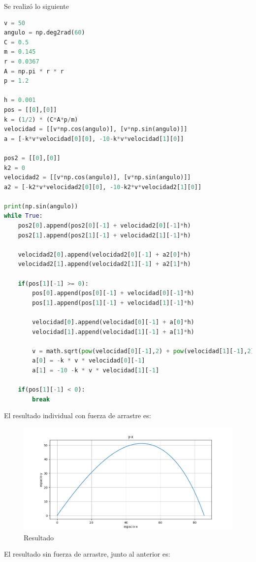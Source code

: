 \documentclass{article}
\begin{document}
Se realizó lo siguiente
\begin{lstlisting}[language=Python,caption=Desafío 1.1]
v = 50
angulo = np.deg2rad(60)
C = 0.5
m = 0.145
r = 0.0367
A = np.pi * r * r
p = 1.2

h = 0.001
pos = [[0],[0]]
k = (1/2) * (C*A*p/m)
velocidad = [[v*np.cos(angulo)], [v*np.sin(angulo)]]
a = [-k*v*velocidad[0][0], -10-k*v*velocidad[1][0]]

pos2 = [[0],[0]]
k2 = 0
velocidad2 = [[v*np.cos(angulo)], [v*np.sin(angulo)]]
a2 = [-k2*v*velocidad2[0][0], -10-k2*v*velocidad2[1][0]]

print(np.sin(angulo))
while True:
    pos2[0].append(pos2[0][-1] + velocidad2[0][-1]*h)
    pos2[1].append(pos2[1][-1] + velocidad2[1][-1]*h)

    velocidad2[0].append(velocidad2[0][-1] + a2[0]*h)
    velocidad2[1].append(velocidad2[1][-1] + a2[1]*h)

    if(pos[1][-1] >= 0):
        pos[0].append(pos[0][-1] + velocidad[0][-1]*h)
        pos[1].append(pos[1][-1] + velocidad[1][-1]*h)

        velocidad[0].append(velocidad[0][-1] + a[0]*h)
        velocidad[1].append(velocidad[1][-1] + a[1]*h)

        v = math.sqrt(pow(velocidad[0][-1],2) + pow(velocidad[1][-1],2))
        a[0] = -k * v * velocidad[0][-1]
        a[1] = -10 -k * v * velocidad[1][-1]

    if(pos[1][-1] < 0):
        break
\end{lstlisting}
El resultado individual con fuerza de arrastre es:
\begin{figure}[H]
    \centering
    \includegraphics[width=1\textwidth]{2_2.png}
    \caption{Resultado}
\end{figure}
El resultado sin fuerza de arrastre, junto al anterior es:
\end{document}
